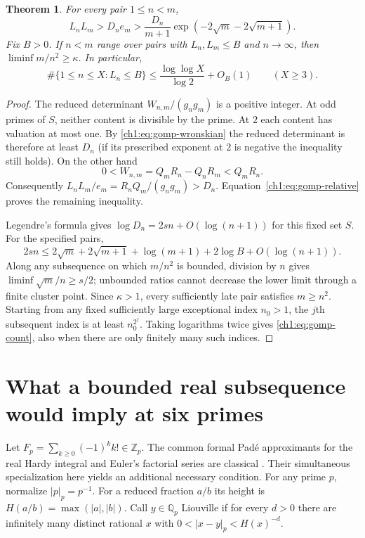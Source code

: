 \documentclass[11pt,a4paper,oneside,openany]{report}
\newtheorem{theorem}{Theorem}[section]
\theoremstyle{remark}\newtheorem{remark}[theorem]{Remark}
\numberwithin{equation}{section}
\begin{document}
\begin{theorem}\label{ch1:thm:gomp-gap}
For every pair $1\le n<m$,
\begin{equation}\label{ch1:eq:gomp-master}
  L_nL_m>D_n e_m>
  \frac{D_n}{m+1}\exp(-2\sqrt m-2\sqrt{m+1}).
\end{equation}
Fix $B>0$. If $n<m$ range over pairs with $L_n,L_m\le B$ and
$n\to\infty$, then $\liminf m/n^2\ge\kappa$. In particular,
\begin{equation}\label{ch1:eq:gomp-count}
 \#\{1\le n\le X:L_n\le B\}
 \le \frac{\log\log X}{\log 2}+O_B(1)
 \qquad(X\ge3).
\end{equation}
\end{theorem}
\begin{proof}
The reduced determinant $W_{n,m}/(g_ng_m)$ is a positive integer.
At odd primes of $S$, neither content is divisible by the prime.
At $2$ each content has valuation at most one. By
\eqref{ch1:eq:gomp-wronskian} the reduced determinant is therefore at
least $D_n$ (if its prescribed exponent at $2$ is negative the
inequality still holds). On the other hand
\[
 0<W_{n,m}=Q_mR_n-Q_nR_m<Q_mR_n.
\]
Consequently $L_n L_m/e_m=R_n Q_m/(g_ng_m)>D_n$.
Equation~\eqref{ch1:eq:gomp-relative} proves the remaining inequality.

Legendre's formula gives $\log D_n=2sn+O(\log(n+1))$ for this fixed
set $S$. For the specified pairs,
\[
 2sn\le 2\sqrt m+2\sqrt{m+1}+\log(m+1)+2\log B+O(\log(n+1)).
\]
Along any subsequence on which $m/n^2$ is bounded, division by $n$
gives $\liminf\sqrt m/n\ge s/2$; unbounded ratios cannot decrease
the lower limit through a finite cluster point. Since $\kappa>1$,
every sufficiently late pair satisfies $m\ge n^2$. Starting from any
fixed sufficiently large exceptional index $n_0>1$, the $j$th subsequent
index is at least $n_0^{2^j}$. Taking logarithms twice gives
\eqref{ch1:eq:gomp-count}, also when there are only finitely many such indices.
\end{proof}

\section{What a bounded real subsequence would imply at six primes}
\label{ch1:sec:gomp-padic}

Let $F_p=\sum_{k\ge0}(-1)^kk!\in\mathbb Z_p$. The common formal
Pad\'e approximants for the real Hardy integral and Euler's factorial
series are classical \cite{mz,ems}. Their simultaneous specialization
here yields an additional necessary condition.
For any prime $p$, normalize $|p|_p=p^{-1}$. For a reduced fraction
$a/b$ its height is $H(a/b)=\max(|a|,|b|)$. Call $y\in\mathbb Q_p$
Liouville if for every $d>0$ there are infinitely many distinct rational
$x$ with $0<|x-y|_p<H(x)^{-d}$.
\end{document}

